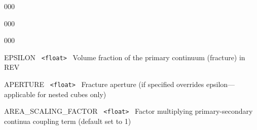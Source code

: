 \begin{deflist}{000}
\begin{deflist}{000}
\begin{deflist}{000}
\item[EPSILON] \ {\tt <float>} \ Volume fraction of the primary continuum (fracture) in REV
\item[APERTURE] \ {\tt <float>} \ Fracture aperture (if specified overrides epsilon---applicable for nested cubes only)
\item[AREA\_SCALING\_FACTOR] \ {\tt <float>} \ Factor multiplying primary-secondary continua coupling term (default set to 1)
\end{deflist}
\item[\keyend]
\end{deflist}
\item[\keyend]
\end{deflist}


